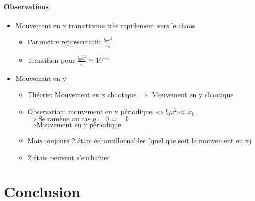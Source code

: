 \documentclass[draft]{beamer}
\begin{document}
  \begin{frame}
  \framesubtitle{Observations}
  \begin{itemize}
  \item Mouvement en x transitionne très rapidement vers le chaos
  \begin{itemize}
  	\item Paramètre représentatif: \(\frac{l_0 \omega ^ 2}{\dot{x}_0}\)
  	\item Transition pour \(\frac{l_0 \omega ^ 2}{\dot{x}_0} \simeq 10^{-7} \)
  \end{itemize}
  \item Mouvement en y
  \begin{itemize}
  	\item Théorie: Mouvement en x chaotique \( \Rightarrow \) Mouvement en y chaotique
  	\item Observation: mouvement en x périodique \( \Leftrightarrow l_0 \omega ^ 2 \ll \dot{x}_0 \)\\ \( \Rightarrow \text{Se ramène au cas } g=0, \omega =0\) \\ \( \Rightarrow \text{Mouvement en y périodique} \)
  	\item Mais toujours 2 états échantillonnables (quel que soit le mouvement en x)
  	\item 2 états peuvent s'enchaîner 
  \end{itemize}
  \end{itemize}
  \end{frame}
  
  \section{Conclusion}
  
  \begin{frame}
  \end{frame}
  
\end{document}
